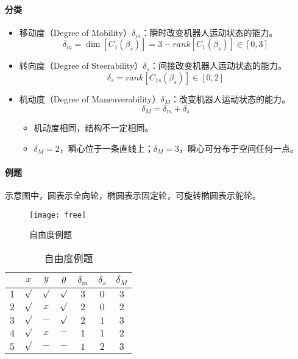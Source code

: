\documentclass[
12pt, %
a4paper, 
oneside, %
headinclude,footinclude, %
]{scrartcl}
\begin{document}
\paragraph{分类}
\begin{itemize}
\item 移动度（Degree of Mobility）$ \delta_m $：瞬时改变机器人运动状态的能力。
$$ \delta_m = \dim[C_1(\beta_s)] = 3 - rank[C_1(\beta_s)] \in [0, 3] $$
\item 转向度（Degree of Steerability）$ \delta_s $：间接改变机器人运动状态的能力。
$$ \delta_s = rank[C_{1s}(\beta_s)] \in [0, 2] $$
\item 机动度（Degree of Maneuverability）$ \delta_M $：改变机器人运动状态的能力。
$$ \delta_M = \delta_m + \delta_s $$
\begin{itemize}
\item 机动度相同，结构不一定相同。
\item $ \delta_M = 2 $，瞬心位于一条直线上；$ \delta_M = 3 $，瞬心可分布于空间任何一点。
\end{itemize}
\end{itemize}
\paragraph{例题}
示意图中，圆表示全向轮，椭圆表示固定轮，可旋转椭圆表示舵轮。

\noindent
\begin{minipage}{0.6\textwidth}
\begin{figure}[H]
\centering 
\texttt{[image: free]} 
\caption{自由度例题}
\end{figure}
\end{minipage}
\begin{minipage}{0.4\textwidth}
\begin{table}[H]
\centering
\begin{tabular}{c|cccccc}
\hline
 & $ x $ & $ y $ & $ \theta $ & $ \delta_m $ & $ \delta_s $ & $ \delta_M $ \\
\hline
$ 1 $ & $ \surd $ & $ \surd $ & $ \surd $ & $ 3 $ & $ 0 $ & $ 3 $ \\
$ 2 $ & $ \surd $ & $ x $ & $ \surd $ & $ 2 $ & $ 0 $ & $ 2 $ \\
$ 3 $ & $ \surd $ & $ - $ & $ \surd $ & $ 2 $ & $ 1 $ & $ 3 $ \\
$ 4 $ & $ \surd $ & $ x $ & $ - $ & $ 1 $ & $ 1 $ & $ 2 $ \\
$ 5 $ & $ \surd $ & $ - $ & $ - $ & $ 1 $ & $ 2 $ & $ 3 $ \\
\hline
\end{tabular}
\caption{自由度例题}
\end{table}
\end{minipage}
\end{document}
